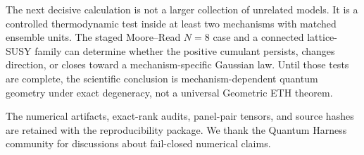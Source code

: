 \documentclass[aps,prb,reprint,superscriptaddress,longbibliography,floatfix]{revtex4-2}
\begin{document}
The next decisive calculation is not a larger collection of unrelated models. It is a controlled thermodynamic test inside at least two mechanisms with matched ensemble units. The staged Moore--Read \(N=8\) case and a connected lattice-SUSY family can determine whether the positive cumulant persists, changes direction, or closes toward a mechanism-specific Gaussian law. Until those tests are complete, the scientific conclusion is mechanism-dependent quantum geometry under exact degeneracy, not a universal Geometric ETH theorem.

\begin{acknowledgments}
The numerical artifacts, exact-rank audits, panel-pair tensors, and source hashes are retained with the reproducibility package. We thank the Quantum Harness community for discussions about fail-closed numerical claims.
\end{acknowledgments}


\end{document}
